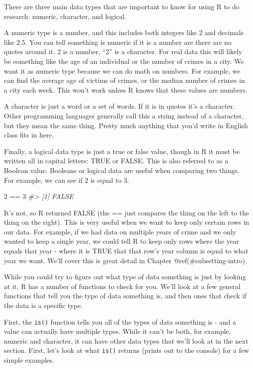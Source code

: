 \documentclass[
]{krantz}
\makeatletter
\newenvironment{Shaded}{\begin{snugshade}}{\end{snugshade}}
\newcommand{\CommentTok}[1]{\textcolor[rgb]{0.37,0.37,0.37}{\textit{#1}}}
\newcommand{\DecValTok}[1]{\textcolor[rgb]{0.06,0.06,0.06}{#1}}
\newcommand{\SpecialCharTok}[1]{\textcolor[rgb]{0,0,0}{#1}}
\newenvironment{kframe}{%
\medskip{}
\setlength{\fboxsep}{.8em}
 \def\at@end@of@kframe{}%
 \ifinner\ifhmode%
  \def\at@end@of@kframe{\end{minipage}}%
  \begin{minipage}{\columnwidth}%
 \fi\fi%
 \def\FrameCommand##1{\hskip\@totalleftmargin \hskip-\fboxsep
 \colorbox{shadecolor}{##1}\hskip-\fboxsep
     \hskip-\linewidth \hskip-\@totalleftmargin \hskip\columnwidth}%
 \MakeFramed {\advance\hsize-\width
   \@totalleftmargin\z@ \linewidth\hsize
   \@setminipage}}%
 {\par\unskip\endMakeFramed%
 \at@end@of@kframe}
\renewenvironment{Shaded}{\begin{kframe}}{\end{kframe}}
\makeatother
\begin{document}
There are three main data types that are important to know for using R to do research: numeric, character, and logical.

A numeric type is a number, and this includes both integers like 2 and decimals like 2.5. You can tell something is numeric if it is a number are there are no quotes around it. 2 is a number, ``2'' is a character. For real data this will likely be something like the age of an individual or the number of crimes in a city. We want it as numeric type because we can do math on numbers. For example, we can find the average age of victims of crimes, or the median number of crimes in a city each week. This won't work unless R knows that these values are numbers.

A character is just a word or a set of words. If it is in quotes it's a character. Other programming languages generally call this a string instead of a character, but they mean the same thing. Pretty much anything that you'd write in English class fits in here.

Finally, a logical data type is just a true or false value, though in R it must be written all in capital letters: TRUE or FALSE. This is also referred to as a Boolean value. Booleans or logical data are useful when comparing two things. For example, we can see if 2 is equal to 3.

\begin{Shaded}
\begin{Highlighting}[]
\DecValTok{2} \SpecialCharTok{==} \DecValTok{3}
\CommentTok{\#\textgreater{} [1] FALSE}
\end{Highlighting}
\end{Shaded}

It's not, so R returned FALSE (the == just compares the thing on the left to the thing on the right). This is very useful when we want to keep only certain rows in our data. For example, if we had data on multiple years of crime and we only wanted to keep a single year, we could tell R to keep only rows where the year equals that year - where it is TRUE that that row's year column is equal to what year we want. We'll cover this is great detail in Chapter @ref(\#subsetting-intro).

While you could try to figure out what type of data something is just by looking at it, R has a number of functions to check for you. We'll look at a few general functions that tell you the type of data something is, and then ones that check if the data is a specific type.

First, the \texttt{is()} function tells you all of the types of data something is - and a value can actually have multiple types. While it can't be both, for example, numeric and character, it can have other data types that we'll look at in the next section. First, let's look at what \texttt{is()} returns (prints out to the console) for a few simple examples.
\end{document}
